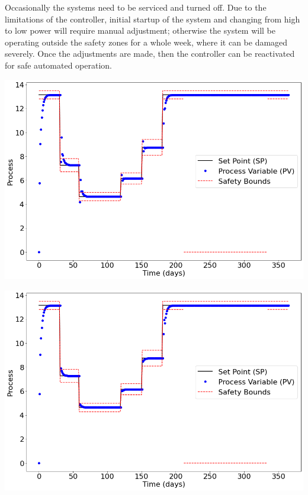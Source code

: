 \documentclass{article}
\begin{document}
\begin{multicols*}{2}
        Occasionally the systems need to be serviced and turned off.  Due to the limitations of the controller, initial startup of the system and changing from high to low power will require manual adjustment; otherwise the system will be operating outside the safety zones for a whole week, where it can be damaged severely.  Once the adjustments are made, then the controller can be reactivated for safe automated operation.

        \vspace{5mm}
        \noindent
        \begin{minipage}{0.49\textwidth}
            \includegraphics[width=\textwidth]{projectPID_untuned.png}
            \label{untunedCon}
        \end{minipage}

        \noindent
        \begin{minipage}{0.49\textwidth}
            \includegraphics[width=\textwidth]{projectPID_tuned.png}
            \label{tunedCon}
        \end{minipage}


\end{multicols*}
\end{document}
